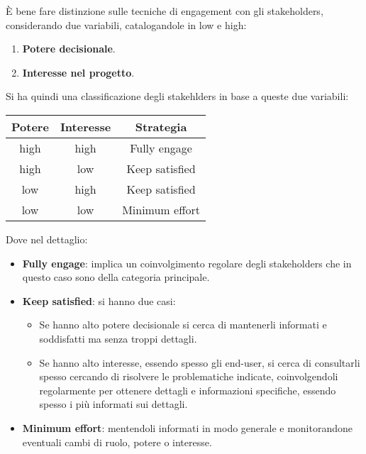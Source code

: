 È bene fare distinzione sulle tecniche di engagement con gli stakeholders,
considerando due variabili, catalogandole in low e high:
\begin{enumerate}
      \item \textbf{Potere decisionale}.
      \item \textbf{Interesse nel progetto}.
\end{enumerate}
Si ha quindi una classificazione degli stakehlders in base a queste due variabili:
\begin{table}[!ht]
      \centering
      \begin{tabular}{c|c|c}
            \textbf{Potere} & \textbf{Interesse} & \textbf{Strategia} \\\hline
            high            & high               & Fully engage       \\
            high            & low                & Keep satisfied     \\
            low             & high               & Keep satisfied     \\
            low             & low                & Minimum effort
      \end{tabular}
\end{table}
Dove nel dettaglio:
\begin{itemize}
      \item \textbf{Fully engage}: implica un coinvolgimento regolare degli
            stakeholders che in questo caso sono della categoria principale.
      \item \textbf{Keep satisfied}: si hanno due casi:
            \begin{itemize}
                  \item Se hanno alto potere decisionale si cerca di mantenerli informati
                        e soddisfatti ma senza troppi dettagli.
                  \item Se hanno alto interesse, essendo spesso gli end-user, si cerca di
                        consultarli spesso cercando di risolvere le problematiche indicate, coinvolgendoli
                        regolarmente per ottenere dettagli e informazioni specifiche, essendo
                        spesso i più informati sui dettagli.
            \end{itemize}
      \item \textbf{Minimum effort}: mentendoli informati in modo generale e
            monitorandone eventuali cambi di ruolo, potere o interesse.
\end{itemize}
